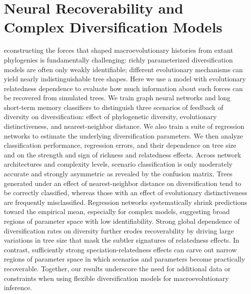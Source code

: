 \chapter{Neural Recoverability and Complex Diversification Models}
\label{chapter3}

econstructing the forces that shaped macroevolutionary histories from extant phylogenies is fundamentally challenging: richly parameterized diversification models are often only weakly identifiable; different evolutionary mechanisms can yield nearly indistinguishable tree shapes. Here we use a model with evolutionary relatedness dependence to evaluate how much information about such forces can be recovered from simulated trees. We train graph neural networks and long short-term memory classifiers to distinguish three scenarios of feedback of diversity on diversification: effect of phylogenetic diversity, evolutionary distinctiveness, and nearest-neighbor distance. We also train a suite of regression networks to estimate the underlying diversification parameters. We then analyze classification performance, regression errors, and their dependence on tree size and on the strength and sign of richness and relatedness effects. Across network architectures and complexity levels, scenario classification is only moderately accurate and strongly asymmetric as revealed by the confusion matrix. Trees generated under an effect of nearest-neighbor distance on diversification tend to be correctly classified, whereas those with an effect of evolutionary distinctiveness are frequently misclassified. Regression networks systematically shrink predictions toward the empirical mean, especially for complex models, suggesting broad regions of parameter space with low identifiability. Strong global dependence of diversification rates on diversity further erodes recoverability by driving large variations in tree size that mask the subtler signatures of relatedness effects. In contrast, sufficiently strong speciation-relatedness effects can carve out narrow regions of parameter space in which scenarios and parameters become practically recoverable. Together, our results underscore the need for additional data or constraints when using flexible diversification models for macroevolutionary inference.

